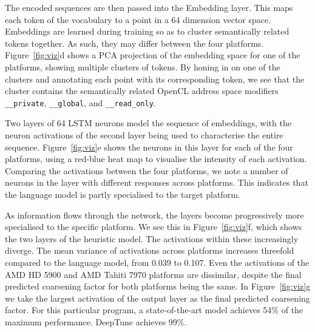 The encoded sequences are then passed into the Embedding layer. This maps each token of the vocabulary to a point in a 64 dimension vector space. Embeddings are learned during training so as to cluster semantically related tokens together. As such, they may differ between the four platforms. Figure~\ref{fig:viz}d shows a PCA projection of the embedding space for one of the platforms, showing multiple clusters of tokens. By honing in on one of the clusters and annotating each point with its corresponding token, we see that the cluster contains the semantically related OpenCL address space modifiers \texttt{\_\_private}, \texttt{\_\_global}, and \texttt{\_\_read\_only}.

Two layers of 64 LSTM neurons model the sequence of embeddings, with the neuron activations of the second layer being used to characterise the entire sequence. Figure~\ref{fig:viz}e shows the neurons in this layer for each of the four platforms, using a red-blue heat map to visualise the intensity of each activation. Comparing the activations between the four platforms, we note a number of neurons in the layer with different responses across platforms. This indicates that the language model is partly specialised to the target platform.

As information flows through the network, the layers become progressively more specialised to the specific platform. We see this in Figure~\ref{fig:viz}f, which shows the two layers of the heuristic model. The activations within these increasingly diverge. The mean variance of activations across platforms increases threefold compared to the language model, from 0.039 to 0.107. Even the activations of the AMD HD 5900 and AMD Tahiti 7970 platforms are dissimilar, despite the final predicted coarsening factor for both platforms being the same. In Figure~\ref{fig:viz}g we take the largest activation of the output layer as the final predicted coarsening factor. For this particular program, a state-of-the-art model achieves 54\% of the maximum performance. DeepTune achieves 99\%.
